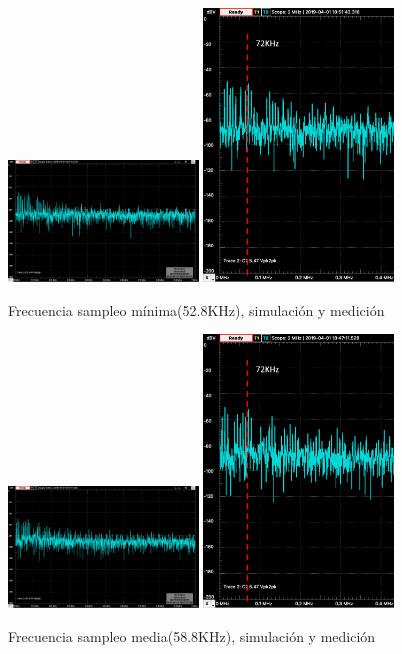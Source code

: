 \documentclass[../../ASSD_TP1_G7.tex]{subfiles}
\begin{document}
\begin{figure}[H]
\centering
{}
{\includegraphics[width=0.45\textwidth]{figures/simpto_8_syh_52,8_espectro.png}}
{\includegraphics[width=0.45\textwidth]{figures/pto_8_syh_52,8_espectro.png}}
\caption{Frecuencia sampleo mínima(52.8KHz), simulación y medición}
\end{figure}

\begin{figure}[H]
\centering
{}
{\includegraphics[width=0.45\textwidth]{figures/simpto_8_syh_58,8_espectro.png}}
{\includegraphics[width=0.45\textwidth]{figures/pto_8_syh_58,8_espectro.png}}
\caption{Frecuencia sampleo media(58.8KHz), simulación y medición}
\end{figure}
\end{document}
